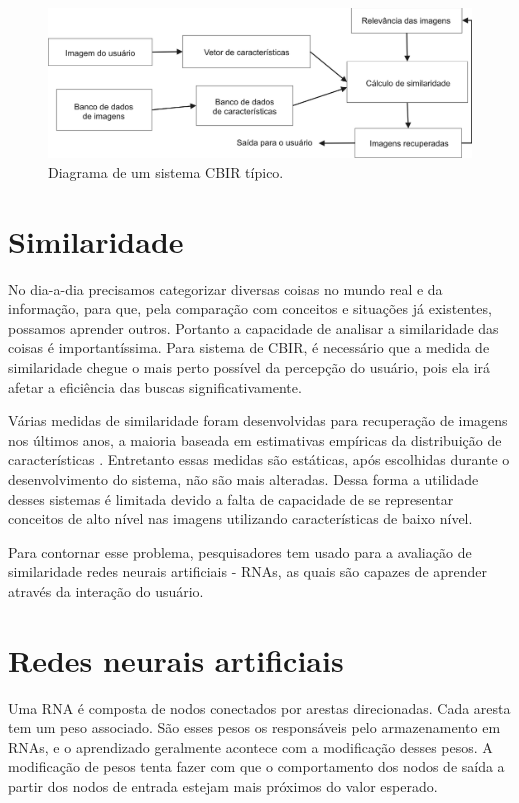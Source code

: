 \begin{figure}[ht]
 \begin{center}
  \includegraphics[width=6in]{imagens/CBIR.png}
 \end{center}
 \caption{Diagrama de um sistema CBIR típico.}
 \label{fig:cbir}
\end{figure}

\section{Similaridade}

No dia-a-dia precisamos categorizar diversas coisas no mundo real e da informação, para que, pela comparação com conceitos e situações já existentes, possamos aprender outros. Portanto a capacidade de analisar a similaridade das coisas é importantíssima. Para sistema de CBIR, é necessário que a medida de similaridade chegue o mais perto possível da percepção do usuário, pois ela irá afetar a eficiência das buscas significativamente.

Várias medidas de similaridade foram desenvolvidas para recuperação de imagens nos últimos anos, a maioria baseada em estimativas empíricas da distribuição de características \cite{feng-chapter}. Entretanto essas medidas são estáticas, após escolhidas durante o desenvolvimento do sistema, não são mais alteradas. Dessa forma a utilidade desses sistemas é limitada devido a falta de capacidade de se representar conceitos de alto nível nas imagens utilizando características de baixo nível.

Para contornar esse problema, pesquisadores \cite{mammography} \cite{cbir-nn-general} tem usado para a avaliação de similaridade redes neurais artificiais - RNAs, as quais são capazes de aprender através da interação do usuário.

\section{Redes neurais artificiais}

Uma RNA é composta de nodos conectados por arestas direcionadas. Cada aresta tem um peso associado. São esses pesos os responsáveis pelo armazenamento em RNAs, e o aprendizado geralmente acontece com a modificação desses pesos. A modificação de pesos tenta fazer com que o comportamento dos nodos de saída a partir dos nodos de entrada estejam mais próximos do valor esperado.

